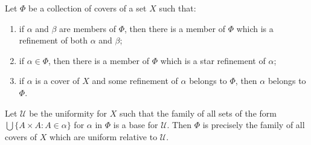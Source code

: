 Let $\Phi$ be a collection of covers of a set $X$ such that:
\begin{enumerate}
\item[(i)] if $\alpha$ and $\beta$ are members of $\Phi$, then there is a member of $\Phi$ which is a refinement of both $\alpha$ and $\beta$;
\item[(ii)] if $\alpha \in \Phi$, then there is a member of $\Phi$ which is a star refinement of $\alpha$;
\item[(iii)] if $\alpha$ is a cover of $X$ and some refinement of $\alpha$ belongs to $\Phi$, then $\alpha$ belongs to $\Phi$.
\end{enumerate}
Let $\mathcal{U}$ be the uniformity for $X$ such that the family of all sets of the form $\bigcup \{A \times A : A \in \alpha\}$ for $\alpha$ in $\Phi$ is a base for $\mathcal{U}$. Then $\Phi$ is precisely the family of all covers of $X$ which are uniform relative to $\mathcal{U}$.
